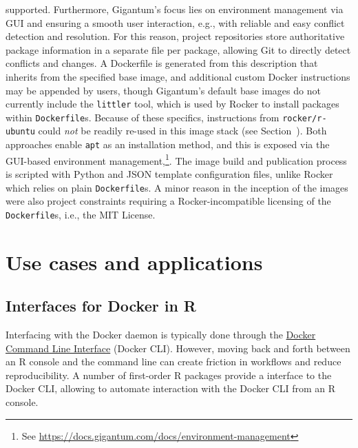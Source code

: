 supported. Furthermore, Gigantum's focus lies on environment management
via GUI and ensuring a smooth user interaction, e.g., with reliable and
easy conflict detection and resolution. For this reason, project
repositories store authoritative package information in a separate file
per package, allowing Git to directly detect conflicts and changes. A
Dockerfile is generated from this description that inherits from the
specified base image, and additional custom Docker instructions may be
appended by users, though Gigantum's default base images do not
currently include the \texttt{littler} tool, which is used by Rocker to
install packages within \texttt{Dockerfile}s. Because of these
specifics, instructions from \texttt{rocker/r-ubuntu} could \emph{not}
be readily re-used in this image stack (see
Section~). Both approaches enable \texttt{apt} as
an installation method, and this is exposed via the GUI-based
environment
management,\footnote{See \href{https://docs.gigantum.com/docs/environment-management}{https://docs.gigantum.com/docs/environment-management}}.
The image build and publication process is scripted with Python and JSON
template configuration files, unlike Rocker which relies on plain
\texttt{Dockerfile}s. A minor reason in the inception of the images were
also project constraints requiring a Rocker-incompatible licensing of
the \texttt{Dockerfile}s, i.e., the MIT License.

\hypertarget{use-cases-and-applications}{%
\section{Use cases and applications}\label{use-cases-and-applications}}

\label{applications}

\hypertarget{interfaces-for-docker-in-r}{%
\subsection{Interfaces for Docker in
R}\label{interfaces-for-docker-in-r}}

\label{interfaces}

Interfacing with the Docker daemon is typically done through the
\href{https://docs.docker.com/engine/reference/commandline/cli/}{Docker
Command Line Interface} (Docker CLI). However, moving back and forth
between an R console and the command line can create friction in
workflows and reduce reproducibility. A number of first-order R packages
provide a interface to the Docker CLI, allowing to automate interaction
with the Docker CLI from an R console.

